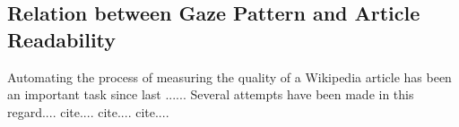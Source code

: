 \documentclass[12pt]{article}
\begin{document}
    
%
%
%
%
%
%
%
%
%

    
    
\subsection{Relation between Gaze Pattern and Article Readability}    
Automating the process of measuring the quality of a Wikipedia article has been an important task since last ...... Several attempts have been made in this regard....
cite....
cite....
cite....
\end{document}
